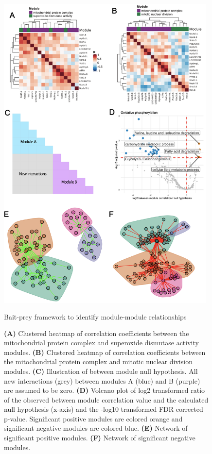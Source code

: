 \begin{figure}[hbt!]
\centering
\includegraphics[width=11cm, keepaspectratio]{figs/paper2/fig5.png}
\caption{Bait-prey framework to identify module-module relationships}
\caption*{\textbf{(A)} Clustered heatmap of correlation coefficients between the mitochondrial protein complex and superoxide dismutase activity modules. \textbf{(B)} Clustered heatmap of correlation coefficients between the mitochondrial protein complex and mitotic nuclear division modules. \textbf{(C)} Illustration of between module null hypothesis. All new interactions (grey) between modules A (blue) and B (purple) are assumed to be zero. \textbf{(D)} Volcano plot of log2 transformed ratio of the observed between module correlation value and the calculated null hypothesis (x-axis) and the -log10 transformed FDR corrected p-value. Significant positive modules are colored orange and significant negative modules are colored blue. \textbf{(E)} Network of significant positive modules. \textbf{(F)} Network of significant negative modules.}
\label{fig:paper2_fig5}
\end{figure}